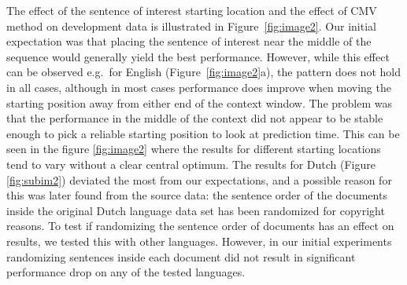 The effect of the sentence of interest starting location and the effect of CMV method on development data is illustrated in Figure~\ref{fig:image2}. Our initial expectation was that placing the sentence of interest near the middle of the sequence would generally yield the best performance. However, while this effect can be observed e.g.\ for English (Figure~\ref{fig:image2}a), the pattern does not hold in all cases, although in most cases performance does improve when moving the starting position away from either end of the context window. The problem was that the performance in the middle of the context did not appear to be stable enough to pick a reliable starting position to look at prediction time. This can be seen in the figure \ref{fig:image2} where the results for different starting locations tend to vary without a clear central optimum. The results for Dutch (Figure \ref{fig:subim2}) deviated the most from our expectations, and a possible reason for this was later found from the source data: the sentence order of the documents inside the original Dutch language data set has been randomized for copyright reasons. To test if randomizing the sentence order of documents has an effect on results, we tested this with other languages. However, in our initial experiments randomizing sentences inside each document did not result in significant performance drop on any of the tested languages. 

